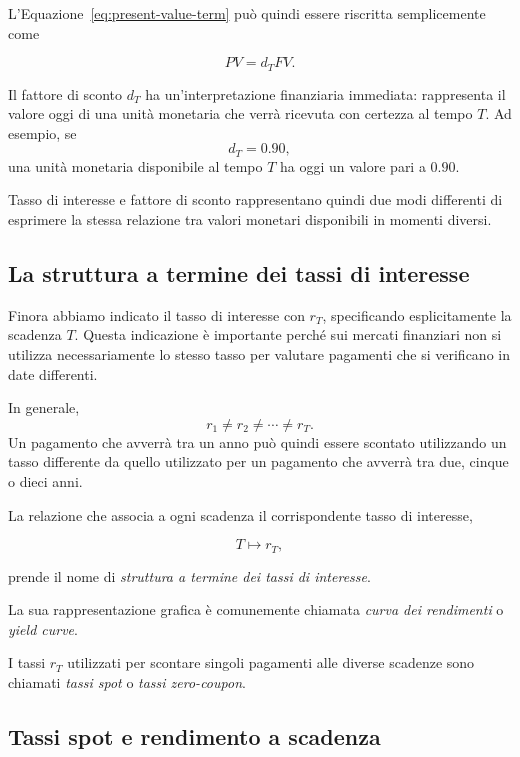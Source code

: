 L'Equazione~\eqref{eq:present-value-term} può quindi essere
riscritta semplicemente come

\begin{equation*}
    PV=d_TFV.
\end{equation*}

Il fattore di sconto $d_T$ ha un'interpretazione finanziaria
immediata: rappresenta il valore oggi di una unità monetaria che
verrà ricevuta con certezza al tempo $T$.
Ad esempio, se
$$    d_T=0.90,$$
una unità monetaria disponibile al tempo $T$ ha oggi un valore
pari a $0.90$.

Tasso di interesse e fattore di sconto rappresentano quindi due
modi differenti di esprimere la stessa relazione tra valori
monetari disponibili in momenti diversi.


\subsection{La struttura a termine dei tassi di interesse}

Finora abbiamo indicato il tasso di interesse con $r_T$,
specificando esplicitamente la scadenza $T$. Questa indicazione
è importante perché sui mercati finanziari non si utilizza
necessariamente lo stesso tasso per valutare pagamenti che si
verificano in date differenti.

In generale,
$$    r_1\neq r_2\neq\cdots\neq r_T.$$
Un pagamento che avverrà tra un anno può quindi essere scontato
utilizzando un tasso differente da quello utilizzato per un
pagamento che avverrà tra due, cinque o dieci anni.

La relazione che associa a ogni scadenza il corrispondente tasso
di interesse,

\begin{equation*}
    T\longmapsto r_T,
\end{equation*}

prende il nome di \emph{struttura a termine dei tassi di
interesse}.

La sua rappresentazione grafica è comunemente chiamata
\emph{curva dei rendimenti} o \emph{yield curve}.

I tassi $r_T$ utilizzati per scontare singoli pagamenti alle
diverse scadenze sono chiamati \emph{tassi spot} o
\emph{tassi zero-coupon}.


\subsection{Tassi spot e rendimento a scadenza}


